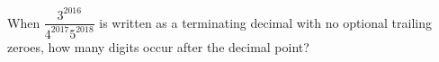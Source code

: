 When $\dfrac{3^{2016}}{4^{2017}5^{2018}}$ is written as a terminating decimal with no optional trailing zeroes, how many digits occur after the decimal point?
